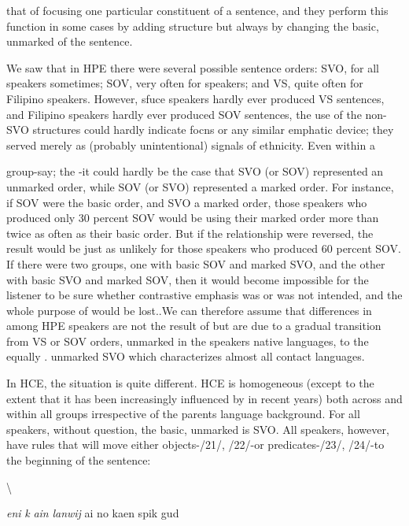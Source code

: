 
that of focusing one particular constituent of a sentence, and they perform this function in some  cases by adding structure but always by changing the basic, unmarked  of the sentence.

We saw that in HPE there were several possible sentence orders: SVO, for all speakers sometimes; SOV, very often for  speak\-ers; and VS, quite often for Filipino speakers. However, sfuce  speakers hardly ever produced VS sentences, and Filipino speakers hardly ever produced SOV sentences, the use of the non-SVO structures could hardly indicate focns or any similar emphatic device; they served merely as (probably unintentional) signals of ethnicity. Even within a

group-say; the -it could hardly be the case that SVO (or SOV) represented an unmarked order, while SOV (or SVO) represented a marked order. For instance, if SOV were the basic order, and SVO a marked order, those speakers who produced only 30 percent SOV would be using their marked order more than twice as often as their basic order. But if the relationship were reversed, the result would be just as unlikely for those speakers who produced 60 percent SOV. If there were two groups, one with basic SOV and marked SVO, and the other with basic SVO and marked SOV, then it would become impossible for the listener to be sure whether contrastive emphasis was or was not intended, and the whole purpose of  would be lost..We can therefore assume that differences in  among HPE speakers are not the result of  but are due to a gradual transition from VS or SOV orders, unmarked in the speakers native languages, to the equally . unmarked SVO which characterizes almost all contact languages.

In HCE, the situation is quite different. HCE is homogeneous (except to the extent that it has been increasingly influenced by  in recent years) both across and within all groups irrespective of the parents language background. For all speakers, without question, the basic, unmarked  is SVO. All speakers, however, have rules that will move either objects-/21/, /22/-or predicates-/23/, /24/-to the beginning of the sentence:

{\textbackslash}


\ea\label{ex:21}
 \textit{eni} \textit{k} \textit{ain} \textit{lanwij} ai no kaen spik gud
\glt
\z

